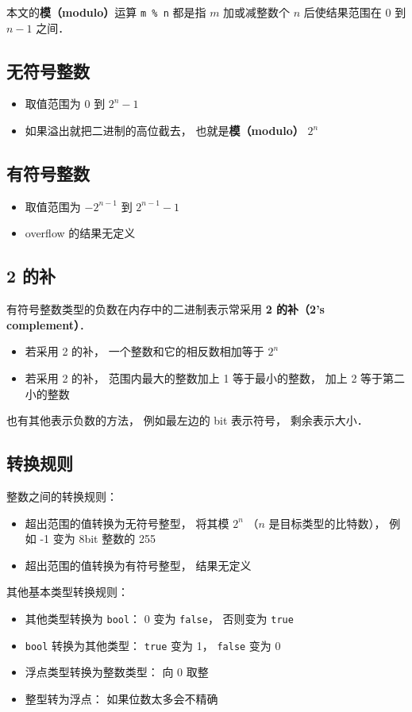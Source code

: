 
本文的\textbf{模（modulo）}运算 \verb|m % n| 都是指 $m$ 加或减整数个 $n$ 后使结果范围在 $0$ 到 $n-1$ 之间．

\subsection{无符号整数}
\begin{itemize}
\item 取值范围为 $0$ 到 $2^n-1$
\item 如果溢出就把二进制的高位截去， 也就是\textbf{模（modulo）} $2^n$
\end{itemize}

\subsection{有符号整数}
\begin{itemize}
\item 取值范围为 $-2^{n-1}$ 到 $2^{n-1}-1$
\item overflow 的结果无定义
\end{itemize}

\subsection{2 的补}
有符号整数类型的负数在内存中的二进制表示常采用 \textbf{2 的补（2's complement）}．
\begin{itemize}
\item 若采用 2 的补， 一个整数和它的相反数相加等于 $2^n$
\item 若采用 2 的补， 范围内最大的整数加上 1 等于最小的整数， 加上 2 等于第二小的整数
\end{itemize}

也有其他表示负数的方法， 例如最左边的 bit 表示符号， 剩余表示大小．

\subsection{转换规则}
整数之间的转换规则：
\begin{itemize}
\item 超出范围的值转换为无符号整型， 将其模 $2^n$ （$n$ 是目标类型的比特数）， 例如 -1 变为 8bit 整数的 255
\item 超出范围的值转换为有符号整型， 结果无定义
\end{itemize}
其他基本类型转换规则：
\begin{itemize}
\item 其他类型转换为 \verb|bool|： 0 变为 \verb|false|， 否则变为 \verb|true|
\item \verb|bool| 转换为其他类型： \verb|true| 变为 1， \verb|false| 变为 0
\item 浮点类型转换为整数类型： 向 0 取整
\item 整型转为浮点： 如果位数太多会不精确
\end{itemize}

